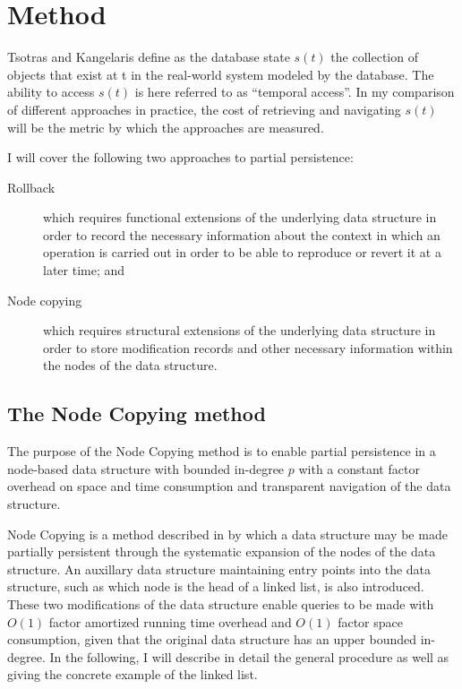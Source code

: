 \chapter{Method}

Tsotras and Kangelaris \cite{Tsotras1995237} define as the database state $s(t)$
the collection of objects that exist at t in the real-world system modeled by
the database. The ability to access $s(t)$ is here referred to as ``temporal
access''. In my comparison of different approaches in practice, the cost of
retrieving and navigating $s(t)$ will be the metric by which the approaches are
measured.

I will cover the following two approaches to partial persistence:
\begin{description}
  \item[Rollback] which requires functional extensions of the underlying data
  structure in order to record the necessary information about the context in
  which an operation is carried out in order to be able to reproduce or revert
  it at a later time; and
  \item[Node copying] which requires structural extensions of the underlying
  data structure in order to store modification records and other necessary
  information within the nodes of the data structure.
\end{description}

\section{The Node Copying method}
The purpose of the Node Copying method is to enable partial persistence in a
node-based data structure with bounded in-degree $p$ with a constant factor
overhead on space and time consumption and transparent navigation of the data
structure.

Node Copying is a method described in \cite{Driscoll198986} by which a data
structure may be made partially persistent through the systematic expansion of
the nodes of the data structure. An auxillary data structure maintaining entry
points into the data structure, such as which node is the head of a linked list,
is also introduced. These two modifications of the data structure enable queries
to be made with $O(1)$ factor amortized running time overhead and $O(1)$ factor
space consumption, given that the original data structure has an upper bounded
in-degree. In the following, I will describe in detail the general procedure as
well as giving the concrete example of the linked list.


